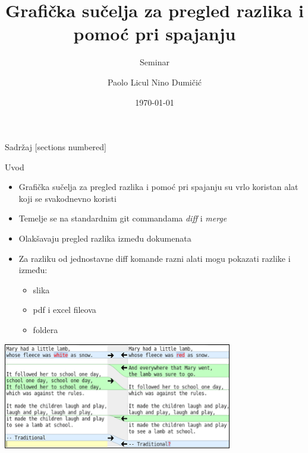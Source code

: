 \documentclass[10pt]{beamer}
\title{Grafička sučelja za pregled razlika i pomoć pri spajanju}
\subtitle{Seminar}
\date{\today}
\author{Paolo Licul Nino Dumičić}
\begin{document}
\maketitle

\begin{frame}{Sadržaj}
  [sections numbered]
  \tableofcontents[hideallsubsections]
\end{frame}


\begin{frame}{Uvod}
	\begin{itemize}
		\item Grafička sučelja za pregled razlika i pomoć pri spajanju su vrlo koristan alat koji se svakodnevno koristi
		\item Temelje se na standardnim git commandama \emph{diff} i \emph{merge}
		\item Olakšavaju pregled razlika između dokumenata
		\item Za razliku od jednostavne diff komande razni alati mogu pokazati razlike i između: \begin{itemize}
		\item slika
		\item pdf i excel fileova
		\item foldera
		\end{itemize}
	\end{itemize} 
	
\includegraphics[width=10cm]{gui.png}
\end{frame}
\end{document}
